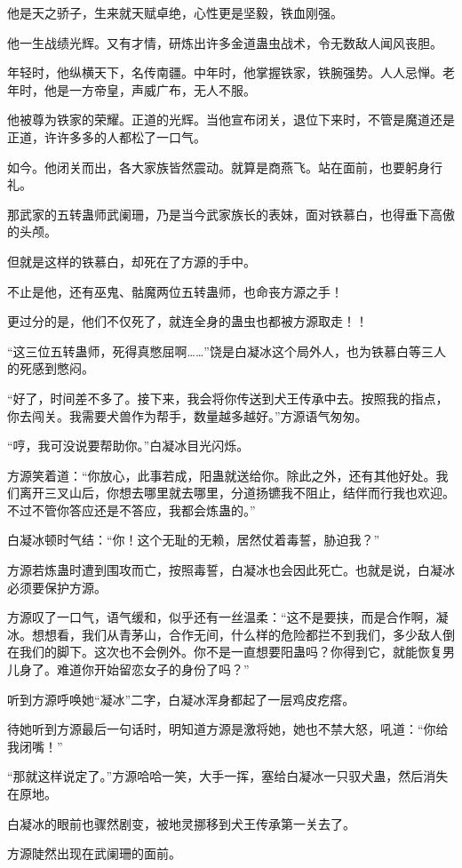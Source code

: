 \begin{this_body}
他是天之骄子，生来就天赋卓绝，心性更是坚毅，铁血刚强。

他一生战绩光辉。又有才情，研炼出许多金道蛊虫战术，令无数敌人闻风丧胆。

年轻时，他纵横天下，名传南疆。中年时，他掌握铁家，铁腕强势。人人忌惮。老年时，他是一方帝皇，声威广布，无人不服。

他被尊为铁家的荣耀。正道的光辉。当他宣布闭关，退位下来时，不管是魔道还是正道，许许多多的人都松了一口气。

如今。他闭关而出，各大家族皆然震动。就算是商燕飞。站在面前，也要躬身行礼。

那武家的五转蛊师武阑珊，乃是当今武家族长的表妹，面对铁慕白，也得垂下高傲的头颅。

但就是这样的铁慕白，却死在了方源的手中。

不止是他，还有巫鬼、骷魔两位五转蛊师，也命丧方源之手！

更过分的是，他们不仅死了，就连全身的蛊虫也都被方源取走！！

“这三位五转蛊师，死得真憋屈啊……”饶是白凝冰这个局外人，也为铁慕白等三人的死感到憋闷。

“好了，时间差不多了。接下来，我会将你传送到犬王传承中去。按照我的指点，你去闯关。我需要犬兽作为帮手，数量越多越好。”方源语气匆匆。

“哼，我可没说要帮助你。”白凝冰目光闪烁。

方源笑着道：“你放心，此事若成，阳蛊就送给你。除此之外，还有其他好处。我们离开三叉山后，你想去哪里就去哪里，分道扬镳我不阻止，结伴而行我也欢迎。不过不管你答应还是不答应，我都会炼蛊的。”

白凝冰顿时气结：“你！这个无耻的无赖，居然仗着毒誓，胁迫我？”

方源若炼蛊时遭到围攻而亡，按照毒誓，白凝冰也会因此死亡。也就是说，白凝冰必须要保护方源。

方源叹了一口气，语气缓和，似乎还有一丝温柔：“这不是要挟，而是合作啊，凝冰。想想看，我们从青茅山，合作无间，什么样的危险都拦不到我们，多少敌人倒在我们的脚下。这次也不会例外。你不是一直想要阳蛊吗？你得到它，就能恢复男儿身了。难道你开始留恋女子的身份了吗？”

听到方源呼唤她“凝冰”二字，白凝冰浑身都起了一层鸡皮疙瘩。

待她听到方源最后一句话时，明知道方源是激将她，她也不禁大怒，吼道：“你给我闭嘴！”

“那就这样说定了。”方源哈哈一笑，大手一挥，塞给白凝冰一只驭犬蛊，然后消失在原地。

白凝冰的眼前也骤然剧变，被地灵挪移到犬王传承第一关去了。

方源陡然出现在武阑珊的面前。


\end{this_body}
